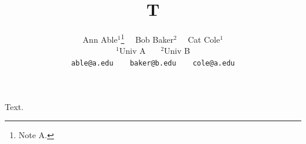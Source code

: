 \documentclass{article}
\title{T}
\author{{Ann Able}$^{1}$\thanks{Note A.}~~ {Bob Baker}$^{2}$~~ {Cat Cole}$^{1}$\\
{\footnotesize $^{1}$Univ A} \ \ \ \small $^{2}$Univ B\\
\texttt{able@a.edu}~~~~\texttt{baker@b.edu}~~~~\texttt{cole@a.edu}}
\begin{document}
\maketitle
Text.
\end{document}
